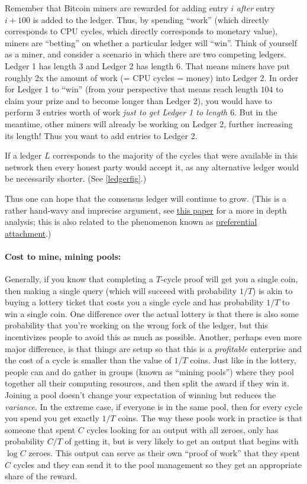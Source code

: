 Remember that Bitcoin miners are rewarded for adding entry \(i\)
\emph{after} entry \(i+100\) is added to the ledger. Thus, by spending
``work'' (which directly corresponds to CPU cycles, which directly
corresponds to monetary value), miners are ``betting'' on whether a
particular ledger will ``win''. Think of yourself as a miner, and
consider a scenario in which there are two competing ledgers. Ledger 1
has length \(3\) and Ledger 2 has length \(6\). That means miners have
put roughly 2x the amount of work (= CPU cycles = money) into Ledger 2.
In order for Ledger 1 to ``win'' (from your perspective that means reach
length \(104\) to claim your prize and to become longer than Ledger 2),
you would have to perform \(3\) entries worth of work \emph{just to get
Ledger 1 to length \(6\)}. But in the meantime, other miners will
already be working on Ledger 2, further increasing its length! Thus you
want to add entries to Ledger 2.

If a ledger \(L\) corresponds to the majority of the cycles that were
available in this network then every honest party would accept it, as
any alternative ledger would be necessarily shorter. (See
\cref{ledgerfig}.)

Thus one can hope that the consensus ledger will continue to grow. (This
is a rather hand-wavy and imprecise argument, see
\href{https://eprint.iacr.org/2015/261}{this paper} for a more in depth
analysis; this is also related to the phenomenon known as
\href{https://en.wikipedia.org/wiki/Preferential_attachment}{preferential
attachment}.)

\paragraph{Cost to mine, mining pools:} Generally, if you know that
completing a \(T\)-cycle proof will get you a single coin, then making a
single query (which will succeed with probability \(1/T\)) is akin to
buying a lottery ticket that costs you a single cycle and has
probability \(1/T\) to win a single coin. One difference over the actual
lottery is that there is also some probability that you're working on
the wrong fork of the ledger, but this incentivizes people to avoid this
as much as possible. Another, perhaps even more major difference, is
that things are setup so that this is a \emph{profitable} enterprise and
the cost of a cycle is smaller than the value of \(1/T\) coins. Just
like in the lottery, people can and do gather in groups (known as
``mining pools'') where they pool together all their computing
resources, and then split the award if they win it. Joining a pool
doesn't change your expectation of winning but reduces the
\emph{variance}. In the extreme case, if everyone is in the same pool,
then for every cycle you spend you get exactly \(1/T\) coins. The way
these pools work in practice is that someone that spent \(C\) cycles
looking for an output with all zeroes, only has probability \(C/T\) of
getting it, but is very likely to get an output that begins with
\(\log C\) zeroes. This output can serve as their own ``proof of work''
that they spent \(C\) cycles and they can send it to the pool management
so they get an appropriate share of the reward.

